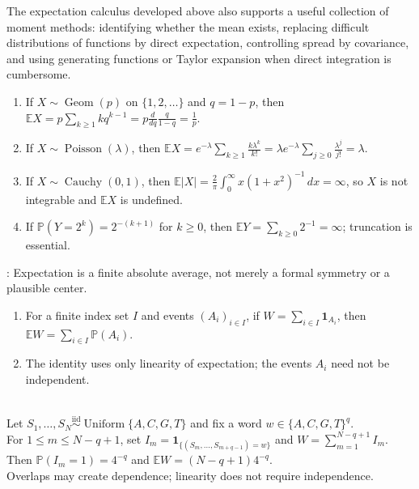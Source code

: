 The expectation calculus developed above also supports a useful collection of moment methods: identifying whether the mean exists, replacing difficult distributions of functions by direct expectation, controlling spread by covariance, and using generating functions or Taylor expansion when direct integration is cumbersome.

\begin{example} \label{ex:expectation-existence-and-classical-means} 
\begin{enumerate}[label=(\roman*)]
\setlength{\itemsep}{0pt}
\item If $X\sim\operatorname{Geom}(p)$ on $\{1,2,\ldots\}$ and $q=1-p$, then $\mathbb{E}X=p\sum\limits_{k\geq1}kq^{k-1}=p\frac{d}{dq}\frac{q}{1-q}=\frac{1}{p}$.
\item If $X\sim\operatorname{Poisson}(\lambda)$, then $\mathbb{E}X=e^{-\lambda}\sum\limits_{k\geq1}\frac{k\lambda^k}{k!}=\lambda e^{-\lambda}\sum\limits_{j\geq0}\frac{\lambda^j}{j!}=\lambda$.
\item If $X\sim\operatorname{Cauchy}(0,1)$, then $\mathbb{E}|X|=\frac{2}{\pi}\int_0^\infty x(1+x^2)^{-1}\,dx=\infty$, so $X$ is not integrable and $\mathbb{E}X$ is undefined.
\item If $\mathbb{P}(Y=2^k)=2^{-(k+1)}$ for $k\geq0$, then $\mathbb{E}Y=\sum\limits_{k\geq0}2^{-1}=\infty$; truncation is essential.
\end{enumerate}
: Expectation is a finite absolute average, not merely a formal symmetry or a plausible center.
\end{example}

\begin{method} \label{meth:indicator-sum-expectation-without-independence} 
\begin{enumerate}[label=(\roman*)]
\setlength{\itemsep}{0pt}
\item For a finite index set $I$ and events $(A_i)_{i\in I}$, if $W=\sum\limits_{i\in I}\mathbf{1}_{A_i}$, then $\mathbb{E}W=\sum\limits_{i\in I}\mathbb{P}(A_i)$.
\item The identity uses only linearity of expectation; the events $A_i$ need not be independent.
\end{enumerate}
\end{method}

\begin{example} \label{ex:dna-word-count-by-linearity} \\
Let $S_1,\ldots,S_N\overset{\mathrm{iid}}{\sim}\operatorname{Uniform}\{A,C,G,T\}$ and fix a word $w\in\{A,C,G,T\}^q$.\\
For $1\leq m\leq N-q+1$, set $I_m=\mathbf{1}_{\{(S_m,\ldots,S_{m+q-1})=w\}}$ and $W=\sum\limits_{m=1}^{N-q+1}I_m$.\\
Then $\mathbb{P}(I_m=1)=4^{-q}$ and $\mathbb{E}W=(N-q+1)4^{-q}$.\\
Overlaps may create dependence; linearity does not require independence.
\end{example}

